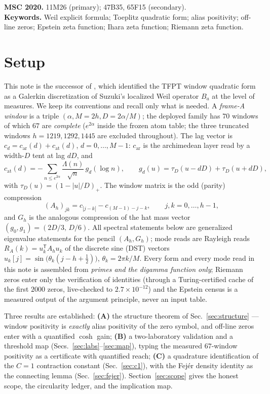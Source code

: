 \documentclass[11pt,a4paper]{article}
\theoremstyle{remark}
\newcommand{\Lam}{\Lambda}
\begin{document}
\medskip
\noindent\textbf{MSC 2020.} 11M26 (primary); 47B35, 65F15 (secondary).\\
\textbf{Keywords.} Weil explicit formula; Toeplitz quadratic form;
alias positivity; off-line zeros; Epstein zeta function; Ihara zeta
function; Riemann zeta function.

\section{Setup}\label{sec:setup}

This note is the successor of \cite{HamW1}, which identified the TFPT
window quadratic form as a Galerkin discretization of Suzuki's localized
Weil operator $B_a$ \cite{Suz26} at the level of measures.  We keep its
conventions and recall only what is needed.  A \emph{frame-A window} is a
triple $(\alpha, M=2h, D=2\alpha/M)$; the deployed family has $70$
windows of which $67$ are \emph{complete} ($e^{2\alpha}$ inside the
frozen atom table; the three truncated windows $h=1219,1292,1445$ are
excluded throughout).  The lag vector is $c_d=c_{\mathrm{ar}}(d)+
c_{\mathrm{at}}(d)$, $d=0,\dots,M-1$: $c_{\mathrm{ar}}$ is the
archimedean layer read by a width-$D$ tent at lag $dD$, and
\begin{equation}\label{eq:cat}
c_{\mathrm{at}}(d)=-\sum_{n\le e^{2\alpha}}\frac{\Lam(n)}{\sqrt n}\,
g_d(\log n),\qquad
g_d(u)=\tau_D(u-dD)+\tau_D(u+dD),
\end{equation}
with $\tau_D(u)=(1-|u|/D)_+$.  The window matrix is the odd (parity)
compression
\begin{equation}\label{eq:window}
(A_h)_{jk}=c_{|j-k|}-c_{(M-1)-j-k},\qquad j,k=0,\dots,h-1,
\end{equation}
and $G_h$ is the analogous compression of the hat mass vector
$(g_0,g_1)=(2D/3,\,D/6)$.  All spectral statements below are generalized
eigenvalue statements for the pencil $(A_h,G_h)$; mode reads are
Rayleigh reads $R_A(k)=u_k^{\mathsf T}A_hu_k$ of the discrete sine
(DST) vectors $u_k[j]=\sin\bigl(\theta_k(j-h+\tfrac12)\bigr)$,
$\theta_k=2\pi k/M$.  Every form and every mode read in this note is
assembled from \emph{primes and the digamma function only}; Riemann
zeros enter only the verification of identities (through a
Turing-certified cache of the first $2000$ zeros, live-checked to
$2.7\times10^{-12}$) and the Epstein census is a measured output of the
argument principle, never an input table.

Three results are established: \textbf{(A)} the structure theorem of
Sec.~\ref{sec:structure} --- window positivity is \emph{exactly} alias
positivity of the zero symbol, and off-line zeros enter with a
quantified $\cosh$ gain; \textbf{(B)} a two-laboratory validation and a
threshold map (Secs.~\ref{sec:labs}--\ref{sec:map}), typing the
measured $67$-window positivity as a certificate with quantified
reach; \textbf{(C)} a quadrature identification of the $C=1$
contraction constant (Sec.~\ref{sec:c1}), with the Fej\'er density
identity as the connecting lemma (Sec.~\ref{sec:fejer}).
Section~\ref{sec:scope} gives the honest scope, the circularity
ledger, and the implication map.
\end{document}
